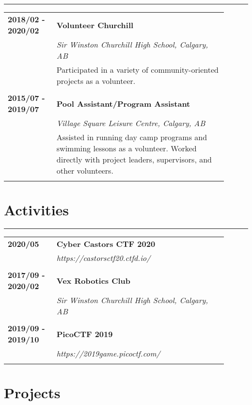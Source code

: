 \documentclass[letterpaper]{article}
\newcommand{\horizontalLine}{%
    \rule{\linewidth}{0.4pt}
    \vspace{1ex}
}
\begin{document}
        \horizontalLine

        \begin{tabular}{p{0.2\linewidth} p{0.7\linewidth}} 
            \textbf{2018/02 - 2020/02} & \large\textbf{Volunteer Churchill} \\
            & \emph{Sir Winston Churchill High School, Calgary, AB} \\
            & Participated in a variety of community-oriented projects as a volunteer. \\
            \\
            \textbf{2015/07 - 2019/07} & \large\textbf{Pool Assistant/Program Assistant} \\
            & \emph{Village Square Leisure Centre, Calgary, AB} \\
            & Assisted in running day camp programs and swimming lessons as a volunteer.
            Worked directly with project leaders, supervisors, and other volunteers. \\
            \\
        \end{tabular}

    \section*{Activities}

        \horizontalLine

        \begin{tabular}{p{0.2\linewidth} p{0.7\linewidth}} 
            \textbf{2020/05} & \large\textbf{Cyber Castors CTF 2020} \\
            & \emph{https://castorsctf20.ctfd.io/} \\
            \\
            \textbf{2017/09 - 2020/02} & \large\textbf{Vex Robotics Club} \\
            & \emph{Sir Winston Churchill High School, Calgary, AB} \\
            \\
            \textbf{2019/09 - 2019/10} & \large\textbf{PicoCTF 2019} \\
            & \emph{https://2019game.picoctf.com/} \\
            \\
        \end{tabular}

    \section*{Projects}
\end{document}
